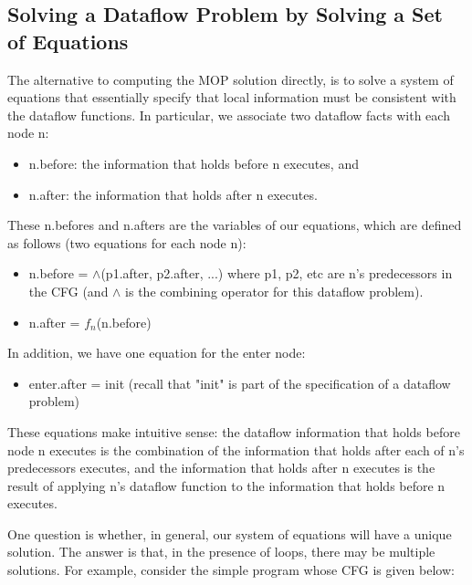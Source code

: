 \subsection{Solving a Dataflow Problem by Solving a Set of Equations}

The alternative to computing the MOP solution directly, is to solve a system of equations
that essentially specify that local information must be consistent with the dataflow functions.
In particular, we associate two dataflow facts with each node n:
\begin{itemize}
	\item n.before: the information that holds before n executes, and
	\item n.after: the information that holds after n executes.
\end{itemize}

These n.befores and n.afters are the variables of our equations,
which are defined as follows (two equations for each node n):


\begin{itemize}
	\item n.before = $\wedge$(p1.after, p2.after, ...)
	      where p1, p2, etc are n's predecessors in the CFG (and $\wedge$ is the
	      combining operator for this dataflow problem).
	\item n.after = $f_n$(n.before)
\end{itemize}

In addition, we have one equation for the enter node:

\begin{itemize}

	\item enter.after = init (recall that "init" is part of the specification of a dataflow problem)
\end{itemize}

These equations make intuitive sense: the dataflow information that holds
before node n executes is the combination of the information that holds after
each of n's predecessors executes, and the information that holds after n
executes is the result of applying n's dataflow function to the information
that holds before n executes.

One question is whether, in general, our system of equations will have a
unique solution. The answer is that, in the presence of loops, there may
be multiple solutions. For example, consider the simple program whose CFG
is given below:



